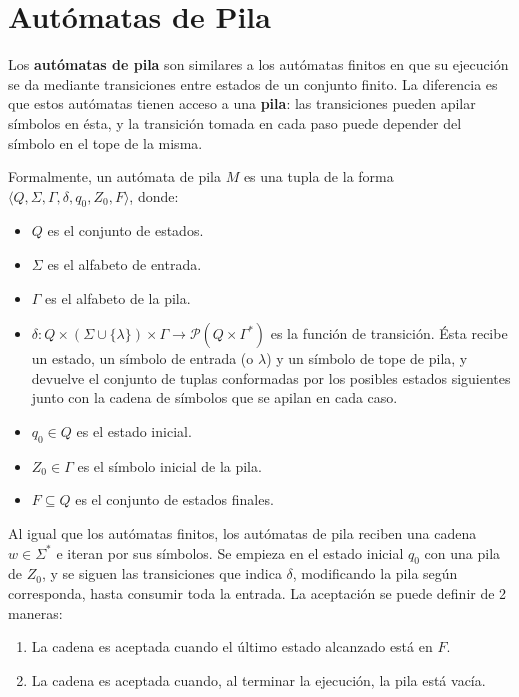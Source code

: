 \section{Autómatas de Pila}

Los \textbf{autómatas de pila} son similares a los autómatas finitos en que su ejecución se da mediante transiciones entre estados de un conjunto finito. La diferencia es que estos autómatas tienen acceso a una \textbf{pila}: las transiciones pueden apilar símbolos en ésta, y la transición tomada en cada paso puede depender del símbolo en el tope de la misma.

Formalmente, un autómata de pila $M$ es una tupla de la forma $\langle Q, \Sigma, \Gamma, \delta, q_0, Z_0, F \rangle$, donde:
\begin{itemize}
    \item $Q$ es el conjunto de estados.
    \item $\Sigma$ es el alfabeto de entrada.
    \item $\Gamma$ es el alfabeto de la pila.
    \item $\delta: Q \times (\Sigma \cup \{ \lambda \}) \times \Gamma \to \mathcal P (Q \times \Gamma^*)$ es la función de transición. Ésta recibe un estado, un símbolo de entrada (o $\lambda$) y un símbolo de tope de pila, y devuelve el conjunto de tuplas conformadas por los posibles estados siguientes junto con la cadena de símbolos que se apilan en cada caso.
    \item $q_0 \in Q$ es el estado inicial.
    \item $Z_0 \in \Gamma$ es el símbolo inicial de la pila.
    \item $F \subseteq Q$ es el conjunto de estados finales.
\end{itemize}

Al igual que los autómatas finitos, los autómatas de pila reciben una cadena $w \in \Sigma^*$ e iteran por sus símbolos. Se empieza en el estado inicial $q_0$ con una pila de $Z_0$, y se siguen las transiciones que indica $\delta$, modificando la pila según corresponda, hasta consumir toda la entrada. La aceptación se puede definir de 2 maneras:
\begin{enumerate}
    \item La cadena es aceptada cuando el último estado alcanzado está en $F$.
    \item La cadena es aceptada cuando, al terminar la ejecución, la pila está vacía.
\end{enumerate}

